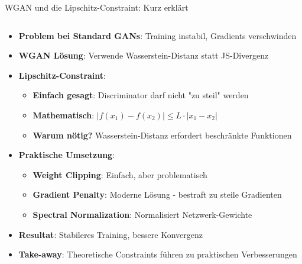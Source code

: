 \documentclass[aspectratio=1610, xcolor=dvipsnames, 9pt]{beamer}
\begin{document}
\begin{frame}{WGAN und die Lipschitz-Constraint: Kurz erklärt}
  \begin{columns}
    \begin{column}{1\textwidth}
      \begin{itemize}
        \item \textbf{Problem bei Standard GANs}: Training instabil, Gradients verschwinden
        \item \textbf{WGAN Lösung}: Verwende Wasserstein-Distanz statt JS-Divergenz
        \item \textbf{Lipschitz-Constraint}: 
        \begin{itemize}
          \item \textbf{Einfach gesagt}: Discriminator darf nicht "zu steil" werden
          \item \textbf{Mathematisch}: $|f(x_1) - f(x_2)| \leq L \cdot |x_1 - x_2|$
          \item \textbf{Warum nötig?} Wasserstein-Distanz erfordert beschränkte Funktionen
        \end{itemize}
        \item \textbf{Praktische Umsetzung}:
        \begin{itemize}
          \item \textbf{Weight Clipping}: Einfach, aber problematisch
          \item \textbf{Gradient Penalty}: Moderne Lösung - bestraft zu steile Gradienten
          \item \textbf{Spectral Normalization}: Normalisiert Netzwerk-Gewichte
        \end{itemize}
        \item \textbf{Resultat}: Stabileres Training, bessere Konvergenz
        \item \textbf{Take-away}: Theoretische Constraints führen zu praktischen Verbesserungen
      \end{itemize}
    \end{column}
  \end{columns}
\end{frame}
\end{document}
